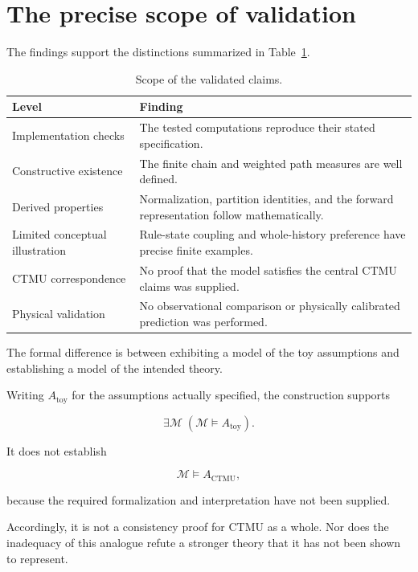 \documentclass[11pt]{article}
\theoremstyle{remark}
\begin{document}
\section{The precise scope of validation}

The findings support the distinctions summarized in Table~\ref{tab:scope}.

\begin{table}[htbp]
\centering
\caption{Scope of the validated claims.}
\label{tab:scope}
\begin{tabular}{@{}p{}p{}@{}}
\toprule
Level & Finding \\
\midrule
Implementation checks & The tested computations reproduce their stated specification. \\
Constructive existence & The finite chain and weighted path measures are well defined. \\
Derived properties & Normalization, partition identities, and the forward representation follow mathematically. \\
Limited conceptual illustration & Rule-state coupling and whole-history preference have precise finite examples. \\
CTMU correspondence & No proof that the model satisfies the central CTMU claims was supplied. \\
Physical validation & No observational comparison or physically calibrated prediction was performed. \\
\bottomrule
\end{tabular}
\end{table}

The formal difference is between exhibiting a model of the toy assumptions and establishing a model of the intended theory.

Writing \(A_{\mathrm{toy}}\) for the assumptions actually specified, the construction supports

\begin{equation}
\exists\mathcal M\;
(\mathcal M\models A_{\mathrm{toy}}).
\end{equation}

It does not establish

\begin{equation}
\mathcal M\models A_{\mathrm{CTMU}},
\end{equation}

because the required formalization and interpretation have not been supplied.

Accordingly, it is not a consistency proof for CTMU as a whole. Nor does the inadequacy of this analogue refute a stronger theory that it has not been shown to represent.
\end{document}
